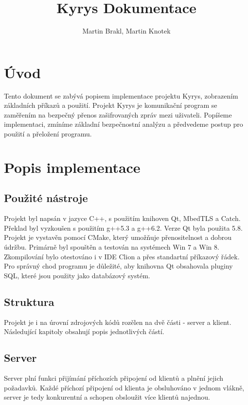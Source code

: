 \documentclass[a4paper]{article}
\title{Kyrys Dokumentace}
\author{Martin Brakl, Martin Knotek}
\begin{document}
\maketitle

\section{Úvod}

Tento dokument se zabývá popisem implementace projektu Kyrys, zobrazením základních příkazů a použití. Projekt Kyrys je komunikační program se zaměřením na bezpečný přenos zašifrovaných zpráv mezi uživateli.
Popíšeme implementaci, zmíníme základní bezpečnostní analýzu a předvedeme postup pro použití a přeložení programu.


\section{Popis implementace}

\subsection{Použité nástroje}

Projekt byl napsán v jazyce C++, s použitím knihoven Qt, MbedTLS a Catch. Překlad byl vyzkoušen s použitím g++5.3 a g++6.2. Verze Qt byla použita 5.8. Projekt je vystavěn pomocí CMake, který umožňuje přenositelnost a dobrou údržbu. Primárně byl spouštěn a testován na systémech Win 7 a Win 8. Zkompilování bylo otestováno i v IDE Clion a přes standartní příkazový řádek. Pro správný chod programu je důležité, aby knihovna Qt obsahovala pluginy SQL, které jsou použity jako databázový systém.

\subsection{Struktura}

Projekt je i na úrovní zdrojových kódů rozělen na dvě části - server a klient. Následující kapitoly obsahují popis jednotlivých částí.

\subsection{Server}

Server plní funkci přijímání příchozích připojení od klientů a plnění jejich požadavků. Každé příchozí připojení od klienta je obsluhováno v jednom vlákně, server je tedy konkurentní a schopen obsloužit více klientů najednou.
\end{document}
